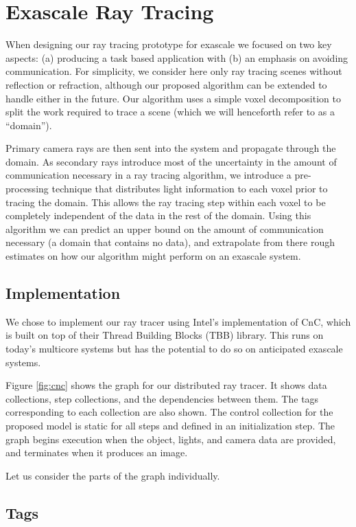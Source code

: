 \section{Exascale Ray Tracing}
\label{sec:raytracing}

When designing our ray tracing prototype for exascale we focused on
two key aspects: (a) producing a task based application with (b) an
emphasis on avoiding communication. For simplicity, we consider here
only ray tracing scenes without reflection or refraction, although our
proposed algorithm can be extended to handle either in the future. Our
algorithm uses a simple voxel decomposition to split the work required
to trace a scene (which we will henceforth refer to as a ``domain'').

Primary camera rays are then sent into the system and propagate
through the domain. As secondary rays introduce most of the uncertainty
in the amount of communication necessary in a ray tracing algorithm,
we introduce a pre-processing technique that distributes light
information to each voxel prior to tracing the domain. This allows the
ray tracing step within each voxel to be completely independent of the
data in the rest of the domain. Using this algorithm we can predict an
upper bound on the amount of communication necessary (a domain that
contains no data), and extrapolate from there rough estimates on how
our algorithm might perform on an exascale system.

\subsection{Implementation}

We chose to implement our ray tracer using Intel’s implementation of
CnC, which is built on top of their Thread Building Blocks (TBB)
library. This runs on today’s multicore systems but has the potential
to do so on anticipated exascale systems.

Figure \ref{fig:cnc} shows the graph for our distributed ray tracer.
It shows data collections, step collections, and the dependencies
between them. The tags corresponding to each collection are also
shown. The control collection for the proposed model is static for all
steps and defined in an initialization step. The graph begins
execution when the object, lights, and camera data are provided, and
terminates when it produces an image.

Let us consider the parts of the graph individually.

\subsection{Tags}

